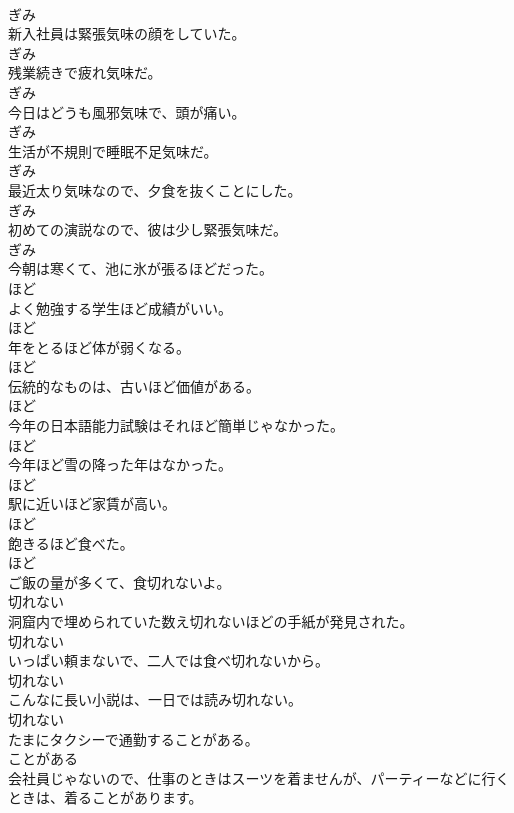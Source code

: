 \documentclass[8pt]{extreport}
\begin{document}
\begin{CJK}{UTF8}{min}
\\	ぎみ
\\	新入社員は緊張気味の顔をしていた。	
\\	ぎみ
\\	残業続きで疲れ気味だ。	
\\	ぎみ
\\	今日はどうも風邪気味で、頭が痛い。	
\\	ぎみ
\\	生活が不規則で睡眠不足気味だ。	
\\	ぎみ
\\	最近太り気味なので、夕食を抜くことにした。	
\\	ぎみ
\\	初めての演説なので、彼は少し緊張気味だ。	
\\	ぎみ
\\	今朝は寒くて、池に氷が張るほどだった。	
\\	ほど
\\	よく勉強する学生ほど成績がいい。	
\\	ほど
\\	年をとるほど体が弱くなる。	
\\	ほど
\\	伝統的なものは、古いほど価値がある。	
\\	ほど
\\	今年の日本語能力試験はそれほど簡単じゃなかった。	
\\	ほど
\\	今年ほど雪の降った年はなかった。	
\\	ほど
\\	駅に近いほど家賃が高い。	
\\	ほど
\\	飽きるほど食べた。	
\\	ほど
\\	ご飯の量が多くて、食切れないよ。	
\\	切れない
\\	洞窟内で埋められていた数え切れないほどの手紙が発見された。	
\\	切れない
\\	いっぱい頼まないで、二人では食べ切れないから。	
\\	切れない
\\	こんなに長い小説は、一日では読み切れない。	
\\	切れない
\\	たまにタクシーで通勤することがある。	
\\	ことがある
\\	会社員じゃないので、仕事のときはスーツを着ませんが、パーティーなどに行くときは、着ることがあります。	

\end{CJK}
\end{document}
